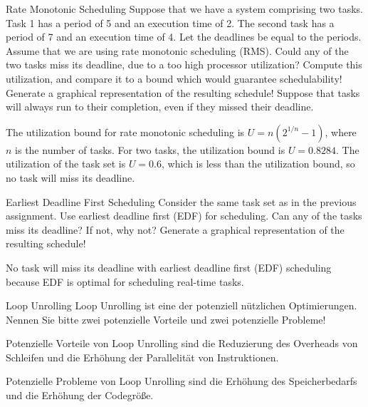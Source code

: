 \documentclass{article}
\begin{document}
\begin{exercise}{Rate Monotonic Scheduling}
  Suppose that we have a system comprising two tasks. Task 1 has a period of 5 and an execution time of 2. The second task has a period of 7 and an execution time of 4. Let the deadlines be equal to the periods. Assume that we are using rate monotonic scheduling (RMS). Could any of the two tasks miss its deadline, due to a too high processor utilization? Compute this utilization, and compare it to a bound which would guarantee schedulability! Generate a graphical representation of the resulting schedule! Suppose that tasks will always run to their completion, even if they missed their deadline.

  \begin{solution}
    The utilization bound for rate monotonic scheduling is $U = n(2^{1/n} - 1)$, where $n$ is the number of tasks. For two tasks, the utilization bound is $U = 0.8284$. The utilization of the task set is $U = 0.6$, which is less than the utilization bound, so no task will miss its deadline.
  \end{solution}
\end{exercise}

\begin{exercise}{Earliest Deadline First Scheduling}
  Consider the same task set as in the previous assignment. Use earliest deadline first (EDF) for scheduling. Can any of the tasks miss its deadline? If not, why not? Generate a graphical representation of the resulting schedule!

  \begin{solution}
    No task will miss its deadline with earliest deadline first (EDF) scheduling because EDF is optimal for scheduling real-time tasks.
  \end{solution}
\end{exercise}

\begin{exercise}{Loop Unrolling}
  Loop Unrolling ist eine der potenziell nützlichen Optimierungen. Nennen Sie bitte zwei potenzielle Vorteile und zwei potenzielle Probleme!

  \begin{solution}
    Potenzielle Vorteile von Loop Unrolling sind die Reduzierung des Overheads von Schleifen und die Erhöhung der Parallelität von Instruktionen.

    Potenzielle Probleme von Loop Unrolling sind die Erhöhung des Speicherbedarfs und die Erhöhung der Codegröße.
  \end{solution}
\end{exercise}
\end{document}

